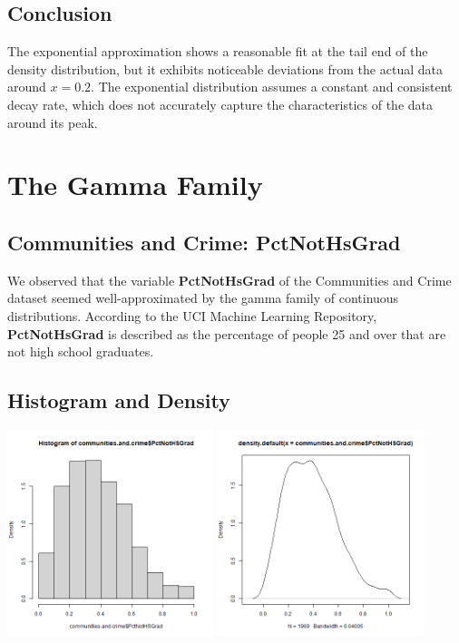 \documentclass[12pt, letterpaper]{report}
\begin{document}
\section{Conclusion}
The exponential approximation shows a reasonable fit at the tail end of the density distribution, but it exhibits noticeable deviations from the actual data around \(x=0.2\). The exponential distribution assumes a constant and consistent decay rate, which does not accurately capture the characteristics of the data around its peak.

\maketitle
\chapter{The Gamma Family}
\section{Communities and Crime: PctNotHsGrad}

We observed that the variable \textbf{PctNotHsGrad} of the Communities and Crime dataset seemed well-approximated by the gamma family of continuous distributions.
According to the UCI Machine Learning Repository, \textbf{PctNotHsGrad} is described as the percentage of people 25 and over that are not high school graduates.


\section{Histogram and Density}


\begin{center}
\includegraphics[width=0.45\textwidth]{gamma/PctNotHsGrad_hist}
\includegraphics[width=0.45\textwidth]{gamma/PctNotHsGrad_density}
\end{center}
\end{document}
